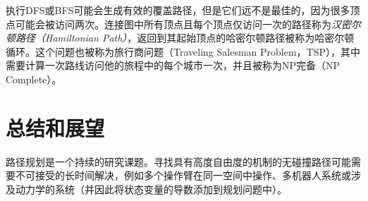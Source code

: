 
执行DFS或BFS可能会生成有效的覆盖路径，但是它们远不是最佳的，因为很多顶点可能会被访问两次。连接图中所有顶点且每个顶点仅访问一次的路径称为\emph{汉密尔顿路径（Hamiltonian Path）}，返回到其起始顶点的哈密尔顿路径被称为哈密尔顿循环。这个问题也被称为旅行商问题（Traveling Salesman Problem，TSP），其中需要计算一次路线访问他的旅程中的每个城市一次，并且被称为NP完备（NP Complete）。


\section{总结和展望}
路径规划是一个持续的研究课题。寻找具有高度自由度的机制的无碰撞路径可能需要不可接受的长时间解决，例如多个操作臂在同一空间中操作、多机器人系统或涉及动力学的系统（并因此将状态变量的导数添加到规划问题中）。


